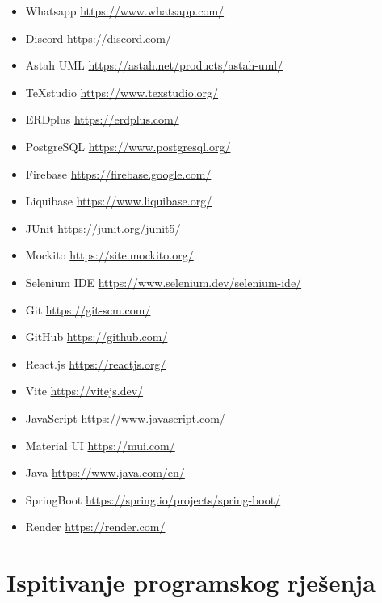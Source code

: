 				\begin{itemize}
					\item \footnotesize Whatsapp		\url{https://www.whatsapp.com/}
					\item \footnotesize Discord			\url{https://discord.com/}
					\item \footnotesize Astah UML		\url{https://astah.net/products/astah-uml/}
					\item \footnotesize TeXstudio		\url{https://www.texstudio.org/}
					\item \footnotesize ERDplus		\url{https://erdplus.com/}
					\item \footnotesize PostgreSQL		\url{https://www.postgresql.org/}
					\item \footnotesize Firebase		\url{https://firebase.google.com/}
					\item \footnotesize Liquibase		\url{https://www.liquibase.org/}
					\item \footnotesize JUnit			\url{https://junit.org/junit5/}
					\item \footnotesize Mockito		\url{https://site.mockito.org/}
					\item \footnotesize Selenium IDE		\url{https://www.selenium.dev/selenium-ide/}
					\item \footnotesize Git				\url{https://git-scm.com/}
					\item \footnotesize GitHub		\url{https://github.com/}
					\item \footnotesize React.js			\url{https://reactjs.org/}
					\item \footnotesize Vite			\url{https://vitejs.dev/}
					\item \footnotesize JavaScript		\url{https://www.javascript.com/}
					\item \footnotesize Material UI			\url{https://mui.com/}
					\item \footnotesize Java				\url{https://www.java.com/en/}
					\item \footnotesize SpringBoot			\url{https://spring.io/projects/spring-boot/}
					\item \footnotesize Render			 \url{https://render.com/}

				\end{itemize}

			
			
			
			\eject 
		
	
		\section{Ispitivanje programskog rješenja}
			
